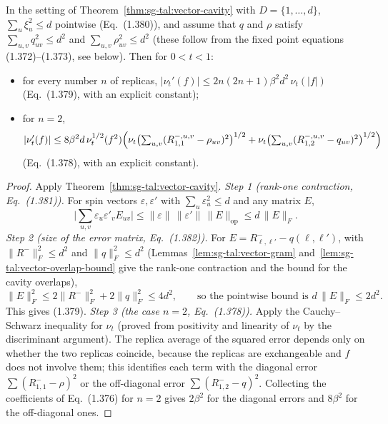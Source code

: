 \begin{theorem}\label{thm:sg-tal:vector-cavity-bounds}
\leanok
{}
In the setting of Theorem~\ref{thm:sg-tal:vector-cavity} with $D=\{1,\dots,d\}$, $\sum_u\xi_u^2\le d$ pointwise (Eq.~(1.380)), and assume that $q$ and $\rho$ satisfy $\sum_{u,v}q_{uv}^2\le d^2$ and $\sum_{u,v}\rho_{uv}^2\le d^2$ (these follow from the fixed point equations (1.372)--(1.373), see below). Then for $0<t<1$:
\begin{itemize}
\item for every number $n$ of replicas, $|\nu_t'(f)|\le 2n(2n+1)\beta^2d^2\,\nu_t(|f|)$ (Eq.~(1.379), with an explicit constant);
\item for $n=2$,
\[
|\nu_t'(f)|\le 8\beta^2d\,\nu_t^{1/2}(f^2)\Bigl(\nu_t\bigl(\textstyle\sum_{u,v}(R^{-,u,v}_{1,1}-\rho_{uv})^2\bigr)^{1/2}+\nu_t\bigl(\textstyle\sum_{u,v}(R^{-,u,v}_{1,2}-q_{uv})^2\bigr)^{1/2}\Bigr)
\]
(Eq.~(1.378), with an explicit constant).
\end{itemize}
\end{theorem}
\begin{proof}
\leanok
Apply Theorem~\ref{thm:sg-tal:vector-cavity}.
\emph{Step 1 (rank-one contraction, Eq.~(1.381)).} For spin vectors $\varepsilon,\varepsilon'$ with $\sum_u\varepsilon_u^2\le d$ and any matrix $E$,
\[
\Big|\sum_{u,v}\varepsilon_u\varepsilon'_vE_{uv}\Big|\le\|\varepsilon\|\,\|\varepsilon'\|\,\|E\|_{\mathrm{op}}\le d\,\|E\|_F .
\]
\emph{Step 2 (size of the error matrix, Eq.~(1.382)).} For $E=R^{-}_{\ell,\ell'}-q(\ell,\ell')$, with $\|R^-\|_F^2\le d^2$ and $\|q\|_F^2\le d^2$ (Lemmas~\ref{lem:sg-tal:vector-gram} and~\ref{lem:sg-tal:vector-overlap-bound} give the rank-one contraction and the bound for the cavity overlaps),
\[
\|E\|_F^2\le2\|R^-\|_F^2+2\|q\|_F^2\le4d^2,\qquad\text{so the pointwise bound is } d\,\|E\|_F\le2d^2 .
\]
This gives (1.379).
\emph{Step 3 (the case $n=2$, Eq.~(1.378)).} Apply the Cauchy--Schwarz inequality for $\nu_t$ (proved from positivity and linearity of $\nu_t$ by the discriminant argument). The replica average of the squared error depends only on whether the two replicas coincide, because the replicas are exchangeable and $f$ does not involve them; this identifies each term with the diagonal error $\sum(R^-_{1,1}-\rho)^2$ or the off-diagonal error $\sum(R^-_{1,2}-q)^2$. Collecting the coefficients of Eq.~(1.376) for $n=2$ gives $2\beta^2$ for the diagonal errors and $8\beta^2$ for the off-diagonal ones.
\end{proof}

